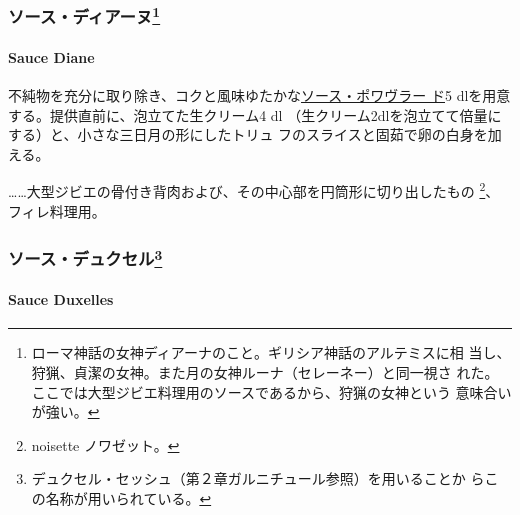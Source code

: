 \begin{recette}
\maeaki

\hypertarget{ux30bdux30fcux30b9ux30c7ux30a3ux30a2ux30fcux30cc28}{%
\subsubsection[ソース・ディアーヌ]{\texorpdfstring{ソース・ディアーヌ\footnote{ローマ神話の女神ディアーナのこと。ギリシア神話のアルテミスに相
  当し、狩猟、貞潔の女神。また月の女神ルーナ（セレーネー）と同一視さ
  れた。ここでは大型ジビエ料理用のソースであるから、狩猟の女神という
  意味合いが強い。}}{ソース・ディアーヌ}}\label{ux30bdux30fcux30b9ux30c7ux30a3ux30a2ux30fcux30cc28}}

\hypertarget{sauce-diane}{%
\paragraph{Sauce Diane}\label{sauce-diane}}

 

不純物を充分に取り除き、コクと風味ゆたかな\protect\hyperlink{sauce-poivrade}{ソース・ポワヴラー
ド}5 dlを用意する。提供直前に、泡立てた生クリーム4 dl
（生クリーム2dlを泡立てて倍量にする）と、小さな三日月の形にしたトリュ
フのスライスと固茹で卵の白身を加える。

\ldots{}\ldots{}大型ジビエの骨付き背肉および、その中心部を円筒形に切り出したもの
\footnote{noisette ノワゼット。}、フィレ料理用。

\maeaki

\hypertarget{ux30bdux30fcux30b9ux30c7ux30e5ux30afux30bbux30eb29}{%
\subsubsection[ソース・デュクセル]{\texorpdfstring{ソース・デュクセル\footnote{デュクセル・セッシュ（第２章ガルニチュール参照）を用いることか
  らこの名称が用いられている。}}{ソース・デュクセル}}\label{ux30bdux30fcux30b9ux30c7ux30e5ux30afux30bbux30eb29}}

\hypertarget{sauce-duxelles}{%
\paragraph{Sauce Duxelles}\label{sauce-duxelles}}


\end{recette}

